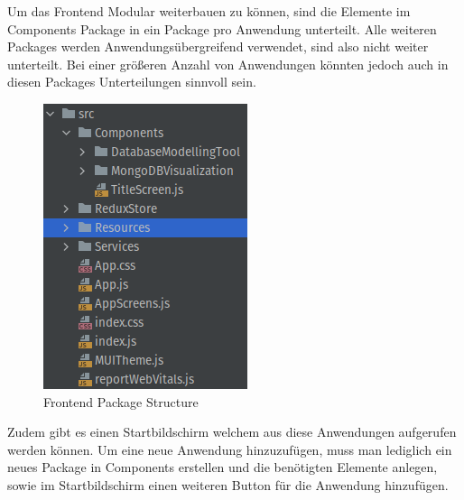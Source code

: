 Um das Frontend Modular weiterbauen zu können, sind die Elemente im Components Package in ein Package pro Anwendung unterteilt.
Alle weiteren Packages werden Anwendungsübergreifend verwendet, sind also nicht weiter unterteilt.
Bei einer größeren Anzahl von Anwendungen könnten jedoch auch in diesen Packages Unterteilungen sinnvoll sein.

\begin{figure}[H]
    \includegraphics[width=\textwidth / 3]{images/frontend_package_structure}
    \caption{Frontend Package Structure}
    \label{fig:frontend_package_structure}
\end{figure}

Zudem gibt es einen Startbildschirm welchem aus diese Anwendungen aufgerufen werden können.
Um eine neue Anwendung hinzuzufügen, muss man lediglich ein neues Package in Components erstellen und die benötigten Elemente anlegen, sowie im Startbildschirm einen weiteren Button für die Anwendung hinzufügen.

